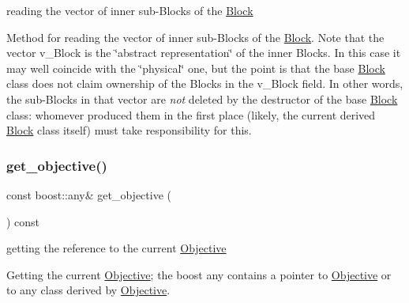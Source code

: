 reading the vector of inner sub-\/\+Blocks of the \mbox{\hyperlink{class_s_m_spp__di__unipi__it_1_1_block}{Block}} 

Method for reading the vector of inner sub-\/\+Blocks of the \mbox{\hyperlink{class_s_m_spp__di__unipi__it_1_1_block}{Block}}. Note that the vector v\+\_\+\+Block is the \char`\"{}abstract representation\char`\"{} of the inner Blocks. In this case it may well coincide with the \char`\"{}physical\char`\"{} one, but the point is that the base \mbox{\hyperlink{class_s_m_spp__di__unipi__it_1_1_block}{Block}} class does not claim ownership of the Blocks in the v\+\_\+\+Block field. In other words, the sub-\/\+Blocks in that vector are {\itshape not} deleted by the destructor of the base \mbox{\hyperlink{class_s_m_spp__di__unipi__it_1_1_block}{Block}} class\+: whomever produced them in the first place (likely, the current derived \mbox{\hyperlink{class_s_m_spp__di__unipi__it_1_1_block}{Block}} class itself) must take responsibility for this. \mbox{\label{class_s_m_spp__di__unipi__it_1_1_block_afed5fdabb9a34885aaa38c3dd4e67834}} 
\subsubsection{\texorpdfstring{get\+\_\+objective()}{get\_objective()}}
{\footnotesize\ttfamily const boost\+::any\& get\+\_\+objective (\begin{DoxyParamCaption}\item[{void}]{ }\end{DoxyParamCaption}) const\hspace{0.3cm}{\ttfamily [inline]}}



getting the reference to the current \mbox{\hyperlink{class_s_m_spp__di__unipi__it_1_1_objective}{Objective}} 

Getting the current \mbox{\hyperlink{class_s_m_spp__di__unipi__it_1_1_objective}{Objective}}; the boost any contains a pointer to \mbox{\hyperlink{class_s_m_spp__di__unipi__it_1_1_objective}{Objective}} or to any class derived by \mbox{\hyperlink{class_s_m_spp__di__unipi__it_1_1_objective}{Objective}}. \mbox{\label{class_s_m_spp__di__unipi__it_1_1_block_a2e682f5c0d4a74503c0cb5ab38fb6428}} 
